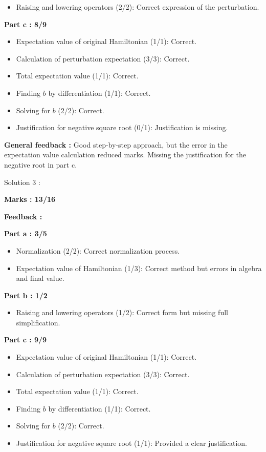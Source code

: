 \documentclass[a4paper,11pt]{article}
\begin{document}
\begin{itemize}
    \item Raising and lowering operators (2/2): Correct expression of the perturbation.
\end{itemize}

\textbf{Part c : 8/9}

\begin{itemize}
    \item Expectation value of original Hamiltonian (1/1): Correct.
    \item Calculation of perturbation expectation (3/3): Correct.
    \item Total expectation value (1/1): Correct.
    \item Finding $b$ by differentiation (1/1): Correct.
    \item Solving for $b$ (2/2): Correct.
    \item Justification for negative square root (0/1): Justification is missing.
\end{itemize}

\textbf{General feedback :}
Good step-by-step approach, but the error in the expectation value calculation reduced marks. Missing the justification for the negative root in part c.


Solution 3 :

\textbf{Marks : 13/16}

\textbf{Feedback :}

\textbf{Part a : 3/5}

\begin{itemize}
    \item Normalization (2/2): Correct normalization process.
    \item Expectation value of Hamiltonian (1/3): Correct method but errors in algebra and final value.
\end{itemize}

\textbf{Part b : 1/2}

\begin{itemize}
    \item Raising and lowering operators (1/2): Correct form but missing full simplification.
\end{itemize}

\textbf{Part c : 9/9}

\begin{itemize}
    \item Expectation value of original Hamiltonian (1/1): Correct.
    \item Calculation of perturbation expectation (3/3): Correct.
    \item Total expectation value (1/1): Correct.
    \item Finding $b$ by differentiation (1/1): Correct.
    \item Solving for $b$ (2/2): Correct.
    \item Justification for negative square root (1/1): Provided a clear justification.
\end{itemize}
\end{document}
